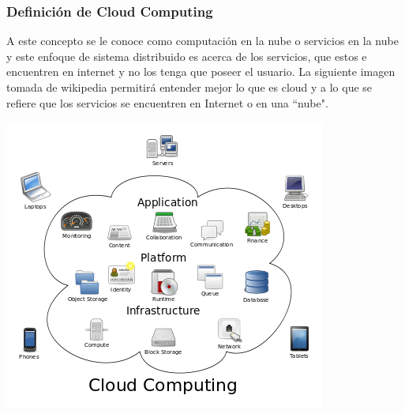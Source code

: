 \documentclass[12pt]{article}
\begin{document}
{{\subsubsection{Definici\'on de Cloud Computing}
A este concepto se le conoce como computaci\'on en la nube o servicios en la nube y este enfoque de sistema distribuido es acerca de los servicios, que estos e encuentren en internet y no los tenga que poseer el usuario.
La siguiente imagen tomada de wikipedia permitir\'a entender mejor lo que es cloud y a lo que se refiere que los servicios se encuentren en Internet o en una ``nube".\\
}
{\centering
\includegraphics[scale=0.6]{cloud.png}
}\\
{\raggedright
}}
\end{document}
